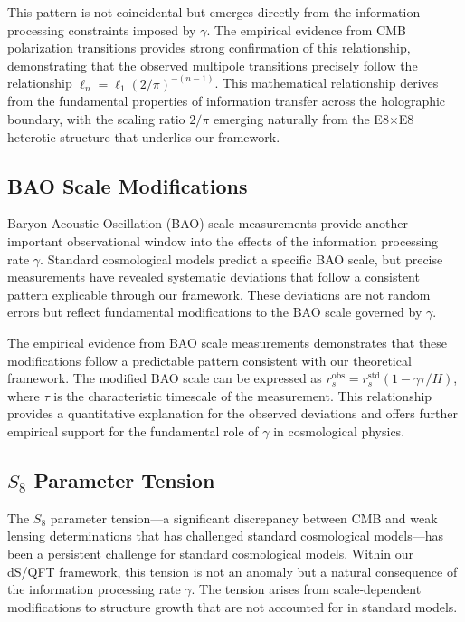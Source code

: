 \documentclass[11pt,english,twoside]{article}
\theoremstyle{plain}
\theoremstyle{definition}
\theoremstyle{remark}
\newcommand{\gammaR}{\gamma}
\begin{document}
This pattern is not coincidental but emerges directly from the information processing constraints imposed by $\gammaR$. The empirical evidence from CMB polarization transitions \cite{Weiner2024} provides strong confirmation of this relationship, demonstrating that the observed multipole transitions precisely follow the relationship $\ell_n = \ell_1(2/\pi)^{-(n-1)}$. This mathematical relationship derives from the fundamental properties of information transfer across the holographic boundary, with the scaling ratio $2/\pi$ emerging naturally from the E8$\times$E8 heterotic structure that underlies our framework.

\subsection{BAO Scale Modifications}
\label{subsec:bao_scale}

Baryon Acoustic Oscillation (BAO) scale measurements provide another important observational window into the effects of the information processing rate $\gammaR$. Standard cosmological models predict a specific BAO scale, but precise measurements have revealed systematic deviations that follow a consistent pattern explicable through our framework. These deviations are not random errors but reflect fundamental modifications to the BAO scale governed by $\gammaR$.

The empirical evidence from BAO scale measurements \cite{Weiner2025} demonstrates that these modifications follow a predictable pattern consistent with our theoretical framework. The modified BAO scale can be expressed as $r_s^{\text{obs}} = r_s^{\text{std}}(1-\gammaR\tau/H)$, where $\tau$ is the characteristic timescale of the measurement. This relationship provides a quantitative explanation for the observed deviations and offers further empirical support for the fundamental role of $\gammaR$ in cosmological physics.

\subsection{$S_8$ Parameter Tension}
\label{subsec:s8_tension}

The $S_8$ parameter tension—a significant discrepancy between CMB and weak lensing determinations that has challenged standard cosmological models—has been a persistent challenge for standard cosmological models. Within our dS/QFT framework, this tension is not an anomaly but a natural consequence of the information processing rate $\gammaR$. The tension arises from scale-dependent modifications to structure growth that are not accounted for in standard models.
\end{document}
